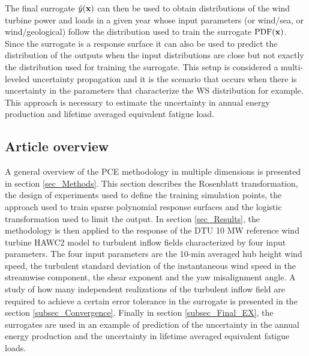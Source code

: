 \documentclass[preprint,12pt]{elsarticle}
\begin{document}


The final surrogate $\hat{y}(\mathbf{x})$ can then be used to obtain distributions of the wind turbine power and loads in a given year whose input parameters (or wind/sea, or wind/geological) follow the distribution used to train the surrogate $\mathrm{PDF}(\mathbf{x})$. Since the surrogate is a response surface it can also be used to predict the distribution of the outputs when the input distributions are close but not exactly the distribution used for training the surrogate. This setup is considered a multi-leveled uncertainty propagation and it is the scenario that occurs when there is uncertainty in the parameters that characterize the WS distribution for example. This approach is necessary to estimate the uncertainty in annual energy production and lifetime averaged equivalent fatigue load.

\subsection{Article overview}

A general overview of the PCE methodology in multiple dimensions is presented in section \ref{sec_Methods}. This section describes the Rosenblatt transformation, the design of experiments used to define the training simulation points, the approach used to train sparse polynomial response surfaces and the logistic transformation used to limit the output. In section \ref{sec_Results}, the methodology is then applied to the response of the DTU 10 MW reference wind turbine HAWC2 model \cite{bak2012light} to turbulent inflow fields characterized by four input parameters. The four input parameters are the 10-min averaged hub height wind speed, the turbulent standard deviation of the instantaneous wind speed in the streamwise component, the shear exponent and the yaw misalignment angle. A study of how many independent realizations of the turbulent inflow field are required to achieve a certain error tolerance in the surrogate is presented in the section \ref{subsec_Convergence}. Finally in section \ref{subsec_Final_EX}, the surrogates are used in an example of prediction of the uncertainty in the annual energy production and the uncertainty in lifetime averaged equivalent fatigue loads.
\end{document}
